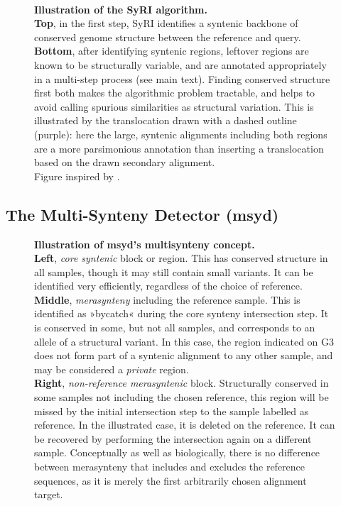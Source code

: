 \begin{figure}[t]
	\centering
	\\[2\baselineskip]
	
	\caption{
		\textbf{Illustration of the SyRI algorithm.}\\
		\textbf{Top}, in the first step, SyRI identifies a syntenic backbone of conserved genome structure between the reference and query.\\
		\textbf{Bottom}, after identifying syntenic regions, leftover regions are known to be structurally variable, and are annotated appropriately in a multi-step process (see main text).
		Finding conserved structure first both makes the algorithmic problem tractable, and helps to avoid calling spurious similarities as structural variation.
		This is illustrated by the translocation drawn with a dashed outline (purple): here the large, syntenic alignments including both regions are a more parsimonious annotation than inserting a translocation based on the drawn secondary alignment.\\
		Figure inspired by \cite{goel19}.
	}
	\label{fig:syri}
\end{figure}

\subsection*{The Multi-Synteny Detector (msyd)}

\begin{figure}[t]
	\centering
	
	\caption{
		\textbf{Illustration of msyd's multisynteny concept.}\\
		\textbf{Left}, \emph{core syntenic} block or region.
		This has conserved structure in all samples, though it may still contain small variants.
		It can be identified very efficiently, regardless of the choice of reference.\\
		\textbf{Middle}, \emph{merasynteny} including the reference sample.
		This is identified as »bycatch« during the core synteny intersection step.
		It is conserved in some, but not all samples, and corresponds to an allele of a structural variant.
		In this case, the region indicated on G3 does not form part of a syntenic alignment to any other sample, and may be considered a \emph{private} region.\\
		\textbf{Right}, \emph{non-reference merasyntenic} block.
		Structurally conserved in some samples not including the chosen reference, this region will be missed by the initial intersection step to the sample labelled as reference.
		In the illustrated case, it is deleted on the reference.
		It can be recovered by performing the intersection again on a different sample.
		Conceptually as well as biologically, there is no difference between merasynteny that includes and excludes the reference sequences, as it is merely the first arbitrarily chosen alignment target. 
	}
	\label{fig:multisyn}
\end{figure}

